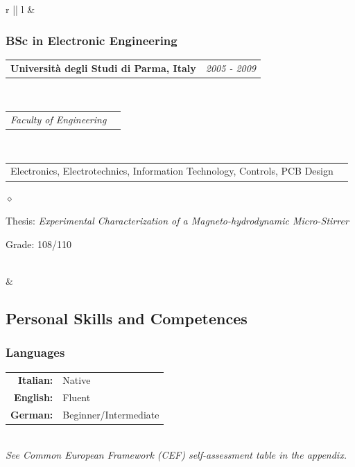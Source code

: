 \documentclass[a4paper]{article}
\makeatletter
\newlength{\sectsep}
\newlength{\subsectsep}
\newcommand{\headerrow}[2]
{\begin{tabular*}{\textwidth}{l@{\extracolsep{\fill}}r}
	#1 &
	#2 \\
\end{tabular*}}
\renewenvironment{itemize}{
  \begin{list}{$\diamond$}{
    \setlength{\topsep}{0.25em}
    \setlength{\itemsep}{0em}
    \setlength{\parskip}{0pt}
    \setlength{\parsep}{0em}
  }
}{
  \end{list}
}
\makeatother
\begin{document}
\begin{longtable}{r || l}
  & \begin{minipage}{0.9\textwidth}
      \vspace{\subsectsep}
      \subsubsection*{BSc in Electronic Engineering}
      \headerrow
  		{\textbf{Università degli Studi di Parma, Italy}}{\emph{2005 - 2009}}
      \\
      \headerrow
        {\emph{Faculty of Engineering}}{}
      \\
      \headerrow
        {Electronics, Electrotechnics, Information Technology, Controls, PCB Design}{}

      \begin{itemize}
          \item Thesis: \emph{Experimental Characterization of a Magneto-hydrodynamic Micro-Stirrer}
          \item Grade: 108/110
      \end{itemize}
      \vfill
  \end{minipage} \\[\sectsep]

  & \begin{minipage}{0.9\textwidth}
      \vspace{\sectsep}
      \subsection*{Personal Skills and Competences}
      \subsubsection*{Languages}
      \begin{tabular}{rl}
        \textbf{Italian:}&Native\\
        \textbf{English:}&Fluent\\
        \textbf{German:}&Beginner/Intermediate\\
      \end{tabular} \vspace{1.5ex} \\
      \hspace*{0.5em} {\footnotesize \emph{See Common European Framework (CEF) self-assessment table in the appendix.}}
    \end{minipage} \\[\sectsep]


\end{longtable}
\end{document}
